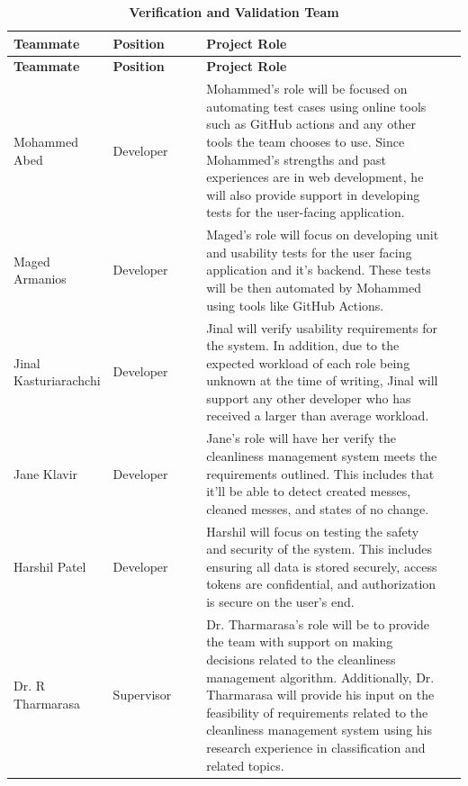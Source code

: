\documentclass[12pt, titlepage]{article}
\begin{document}
\begin{longtable}{|>{\raggedright\arraybackslash}p{0.21\linewidth} | >{\raggedright\arraybackslash}p{0.21\linewidth} | >{\raggedright\arraybackslash}p{0.60\linewidth}| >{\raggedright\arraybackslash}p{0.21\linewidth}| }
    \caption{\bf Verification and Validation Team} \label{tab:my_label} \\
    
    \hline
    \textbf{Teammate} & \textbf{Position} & \textbf{Project Role}\\
    \hline
    \endfirsthead
    
    \hline
    \textbf{Teammate} & \textbf{Position} & \textbf{Project Role}\\
    \hline
    \endhead
    
    \hline
    \endfoot
    
    \hline
    \endlastfoot


    \hline
    Mohammed Abed & Developer & Mohammed's role will be focused on automating test cases using online tools such as GitHub actions and any other tools the team chooses to use. Since Mohammed's strengths and past experiences are in web development, he will also provide support in developing tests for the user-facing application. \\
   	\hline
    Maged Armanios & Developer & Maged's role will focus on developing unit and usability tests for the user facing application and it's backend. These tests will be then automated by Mohammed using tools like GitHub Actions. \\
    \hline
    Jinal Kasturiarachchi & Developer & Jinal will verify usability requirements for the system. In addition, due to the expected workload of each role being unknown at the time of writing, Jinal will support any other developer who has received a larger than average workload. \\
    \hline
    Jane Klavir & Developer & Jane's role will have her verify the cleanliness management system meets the requirements outlined. This includes that it'll be able to detect created messes, cleaned messes, and states of no change. \\
    \hline
    Harshil Patel & Developer & Harshil will focus on testing the safety and security of the system. This includes ensuring all data is stored securely, access tokens are confidential, and authorization is secure on the user's end.  \\
	\hline
	Dr. R Tharmarasa & Supervisor & Dr. Tharmarasa's role will be to provide the team with support on making decisions related to the cleanliness management algorithm. Additionally, Dr. Tharmarasa will provide his input on the feasibility of requirements related to the cleanliness management system using his research experience in classification and related topics.
\end{longtable}
\end{document}
